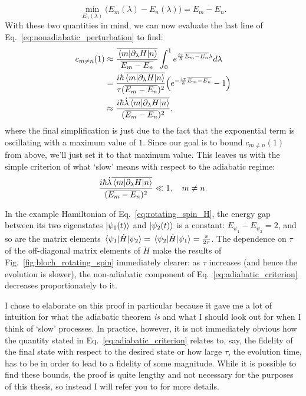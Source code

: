     \begin{equation}\label{eq:min_energy_diff}
        \min_{E_n(\lambda)} \Big(E_m(\lambda) - E_n(\lambda)\Big) = \overline{E_m - E_n}.
    \end{equation}
    With these two quantities in mind, we can now evaluate the last line of Eq.~\eqref{eq:nonadiabatic_perturbation} to find:
    \begin{equation}\label{eq:deriving_adiabatic_condition_final}
        \begin{aligned}
            c_{m \neq n} (1) &\approx \frac{\overline{\mel{m}{\partial_{\lambda}H}{n}}}{\overline{E_m - E_n}} \int_0^1 e^{\frac{i \tau }{\hbar} \overline{E_m - E_n} \lambda} d \lambda \\
            &= \frac{i \hbar \overline{\mel{m}{\partial_{\lambda}H}{n}}}{\tau(\overline{E_m - E_n})^2} \Big(e^{-\frac{i \tau }{\hbar}\overline{E_m - E_n}} - 1 \Big) \\
            &\approx \frac{i \hbar \dot{\lambda} \overline{\mel{m}{\partial_{\lambda}H}{n}}}{(\overline{E_m - E_n})^2},
        \end{aligned}
    \end{equation}
    where the final simplification is just due to the fact that the exponential term is oscillating with a maximum value of $1$. Since our goal is to bound $c_{m \neq n} (1)$ from above, we'll just set it to that maximum value. This leaves us with the simple criterion of what `slow' means with respect to the adiabatic regime:
    \begin{equation}\label{eq:adiabatic_criterion}
        \frac{i \hbar \dot{\lambda} \overline{\mel{m}{\partial_{\lambda}H}{n}}}{(\overline{E_m - E_n})^2} \ll 1, \quad m \neq n.
    \end{equation}

    In the example Hamiltonian of Eq.~\eqref{eq:rotating_spin_H}, the energy gap between its two eigenstates $\ket{\psi_1(t)}$ and $\ket{\psi_2(t)}$ is a constant: $E_{\psi_1} - E_{\psi_2} = 2$, and so are the matrix elements $\mel{\psi_1}{\dot{H}}{\psi_2} = \mel{\psi_2}{\dot{H}}{\psi_1} = \frac{\pi}{2 \tau}$. The dependence on $\tau$ of the off-diagonal matrix elements of $\dot{H}$ make the results of Fig.~\ref{fig:bloch_rotating_spin} immediately clearer: as $\tau$ increases (and hence the evolution is slower), the non-adiabatic component of Eq.~\eqref{eq:adiabatic_criterion} decreases proportionately to it. 

    I chose to elaborate on this proof in particular because it gave me a lot of intuition for what the adiabatic theorem \emph{is} and what I should look out for when I think of `slow' processes. In practice, however, it is not immediately obvious how the quantity stated in Eq.~\eqref{eq:adiabatic_criterion} relates to, say, the fidelity of the final state with respect to the desired state or how large $\tau$, the evolution time, has to be in order to lead to a fidelity of some magnitude. While it is possible to find these bounds, the proof is quite lengthy and not necessary for the purposes of this thesis, so instead I will refer you to \cite{reichardt_quantum_2004, childs_lecture_2008} for more details.
    
